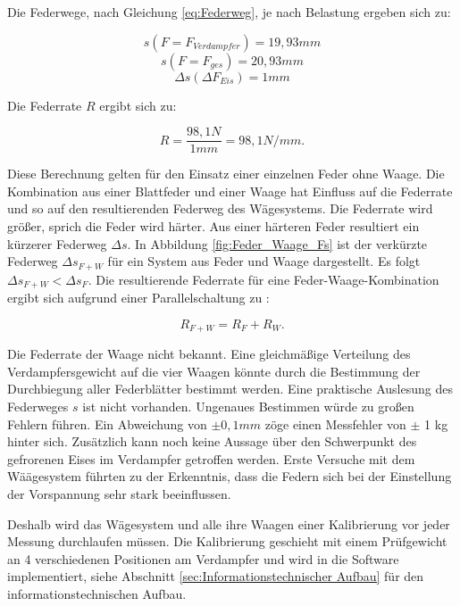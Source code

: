 Die Federwege, nach Gleichung \ref{eq:Federweg}, je nach Belastung ergeben sich zu:

\begin{equation*}
  s(F= F_{Verdampfer})=19,93 mm 
 \end{equation*}
 \begin{equation*}
 s(F= F_{ges})= 20,93 mm 
 \end{equation*}
\begin{equation*}
 \Delta s(\Delta F_{Eis}) = 1 mm
\end{equation*}

Die Federrate $R$ ergibt sich zu:

\begin{equation*}
R = \frac{98,1 N}{1 mm} = 98,1 N/mm.
\end{equation*}

Diese Berechnung gelten für den Einsatz einer einzelnen Feder ohne Waage. Die Kombination aus einer Blattfeder und einer Waage hat Einfluss auf die Federrate und so auf den resultierenden Federweg des Wägesystems. Die Federrate wird größer, sprich die Feder wird härter. Aus einer härteren Feder resultiert ein kürzerer Federweg $\Delta s$.  In Abbildung \ref{fig:Feder_Waage_Fs} ist der verkürzte Federweg $\Delta s_{F+W}$ für ein System aus Feder und Waage dargestellt. Es folgt $\Delta s_{F+W}< \Delta s_{F}$. Die resultierende Federrate für eine Feder-Waage-Kombination ergibt sich aufgrund einer Parallelschaltung zu :

\begin{equation}
R_{F+W}= R_F + R_W.
\end{equation}

Die Federrate der Waage nicht bekannt. Eine gleichmäßige Verteilung des Verdampfersgewicht auf die vier Waagen könnte durch die Bestimmung der Durchbiegung aller Federblätter bestimmt werden. Eine praktische Auslesung des Federweges $s$ ist nicht vorhanden. Ungenaues Bestimmen würde zu großen Fehlern führen. Ein Abweichung von $\pm 0,1 mm$ zöge einen Messfehler von $\pm$ 1 kg hinter sich.  Zusätzlich kann noch keine Aussage über den Schwerpunkt des gefrorenen Eises im Verdampfer getroffen werden.
Erste Versuche mit dem Wäägesystem führten zu der Erkenntnis, dass die Federn sich bei der Einstellung der Vorspannung sehr stark beeinflussen. 
 
Deshalb wird das Wägesystem und alle ihre Waagen einer Kalibrierung vor jeder Messung durchlaufen müssen. Die Kalibrierung geschieht mit einem Prüfgewicht an 4 verschiedenen Positionen am Verdampfer und wird in die Software implementiert, siehe Abschnitt \ref{sec:Informationstechnischer Aufbau} für den informationstechnischen Aufbau. 

